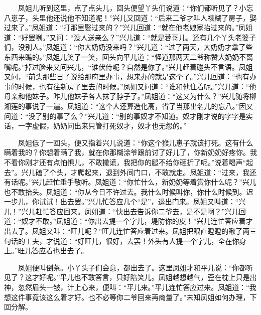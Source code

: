 　　凤姐儿听到这里，点了点头儿，回头便望丫头们说道：“你们都听见了？小忘八崽子，头里他还说他不知道呢！”兴儿又回道：“后来二爷才叫人裱糊了房子，娶过来了。”凤姐道：“打那里娶过来的？”兴儿回道：“就在他老娘家抬过来的。”凤姐道：“好罢咧。”又问：“没人送亲么？”兴儿道：“就是蓉哥儿。还有几个丫头老婆子们，没别人。”凤姐道：“你大奶奶没来吗？”兴儿道：“过了两天，大奶奶才拿了些东西来瞧的。”凤姐儿笑了一笑，回头向平儿道：“怪道那两天二爷称赞大奶奶不离嘴呢。”掉过脸来又问兴儿，“谁伏侍呢？自然是你了。”兴儿赶着碰头不言语。凤姐又问，“前头那些日子说给那府里办事，想来办的就是这个了。”兴儿回道：“也有办事的时候，也有往新房子里去的时候。”凤姐又问道：“谁和他住着呢。”兴儿道：“他母亲和他妹子。昨儿他妹子各人抹了脖子了。”凤姐道：“这又为什么？”兴儿随将柳湘莲的事说了一遍。凤姐道：“这个人还算造化高，省了当那出名儿的忘八。”因又问道：“没了别的事了么？”兴儿道：“别的事奴才不知道。奴才刚才说的字字是实话，一字虚假，奶奶问出来只管打死奴才，奴才也无怨的。”

　　凤姐低了一回头，便又指着兴儿说道：“你这个猴儿崽子就该打死。这有什么瞒着我的？你想着瞒了我，就在你那糊涂爷跟前讨了好儿了，你新奶奶好疼你。我不看你刚才还有点怕惧儿，不敢撒谎，我把你的腿不给你砸折了呢。”说着喝声“起去”。兴儿磕了个头，才爬起来，退到外间门口，不敢就走。凤姐道：“过来，我还有话呢。”兴儿赶忙垂手敬听。凤姐道：“你忙什么，新奶奶等着赏你什么呢？”兴儿也不敢抬头。凤姐道：“你从今日不许过去。我什么时候叫你，你什么时候到。迟一步儿，你试试！出去罢。”兴儿忙答应几个“是”，退出门来。凤姐又叫道：“兴儿！”兴儿赶忙答应回来。凤姐道：“快出去告诉你二爷去，是不是啊？”兴儿回道：“奴才不敢。”凤姐道：“你出去提一个字儿，堤防你的皮！”兴儿连忙答应着才出去了。凤姐又叫：“旺儿呢？”旺儿连忙答应着过来。凤姐把眼直瞪瞪的瞅了两三句话的工夫，才说道：“好旺儿，很好，去罢！外头有人提一个字儿，全在你身上。”旺儿答应着也出去了。

　　凤姐便叫倒茶。小丫头子们会意，都出去了。这里凤姐才和平儿说：“你都听见了？这才好呢。”平儿也不敢答言，只好陪笑儿。凤姐越想越气，歪在枕上只是出神，忽然眉头一皱，计上心来，便叫：“平儿来。”平儿连忙答应过来。凤姐道：“我想这件事竟该这么着才好。也不必等你二爷回来再商量了。”未知凤姐如何办理，下回分解。

